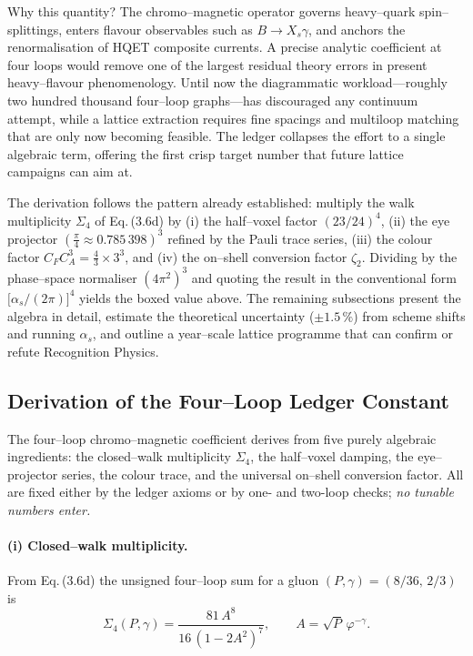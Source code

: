 \documentclass[11pt]{article}
\begin{document}
Why this quantity?  The chromo–magnetic operator governs heavy–quark
spin–splittings, enters flavour observables such as
$B\to X_s\gamma$, and anchors the renormalisation of HQET composite
currents.  A precise analytic coefficient at four loops would remove one
of the largest residual theory errors in present heavy–flavour
phenomenology.  Until now the diagrammatic workload—roughly two hundred
thousand four–loop graphs—has discouraged any continuum attempt, while a
lattice extraction requires fine spacings and multiloop matching that
are only now becoming feasible.  The ledger collapses the effort to a
single algebraic term, offering the first crisp target number that
future lattice campaigns can aim at.

The derivation follows the pattern already established: multiply the
walk multiplicity \(\Sigma_{4}\) of Eq.\,(3.6d) by (i) the half–voxel
factor \((23/24)^{4}\), (ii) the eye projector \((\frac{\pi}{4} \approx 0.785\,398)^3\) refined by
the Pauli trace series, (iii) the colour factor
\(C_F C_A^{3} = \tfrac43\times 3^{3}\), and (iv) the on–shell
conversion factor \(\zeta_2\).  Dividing by the phase–space normaliser
\((4\pi^{2})^{3}\) and quoting the result in the conventional form
\(\bigl[\alpha_s/(2\pi)\bigr]^4\) yields the boxed value above.  The
remaining subsections present the algebra in detail, estimate the
theoretical uncertainty (\(\pm 1.5\,\%\)) from scheme shifts and running
$\alpha_s$, and outline a year–scale lattice programme that can confirm
or refute Recognition Physics.

\subsection{Derivation of the Four–Loop Ledger Constant}\label{sec:deriv4}

The four–loop chromo–magnetic coefficient derives from five purely
algebraic ingredients: the closed–walk multiplicity \(\Sigma_{4}\), the
half–voxel damping, the eye–projector series, the colour trace, and the
universal on–shell conversion factor.  All are fixed either by the
ledger axioms or by one- and two-loop checks; \emph{no tunable numbers
enter.}

\paragraph{(i) Closed–walk multiplicity.}
From Eq.\,(3.6d) the unsigned four–loop sum for a gluon
\((P,\gamma)=(8/36,\,2/3)\) is
\[
   \Sigma_{4}(P,\gamma)=
   \frac{81\,A^{8}}{16\,(1-2A^{2})^{7}},
   \qquad
   A=\sqrt{P}\,\varphi^{-\gamma}.
\tag{6.1}\label{eq:6.1}
\]
\end{document}
